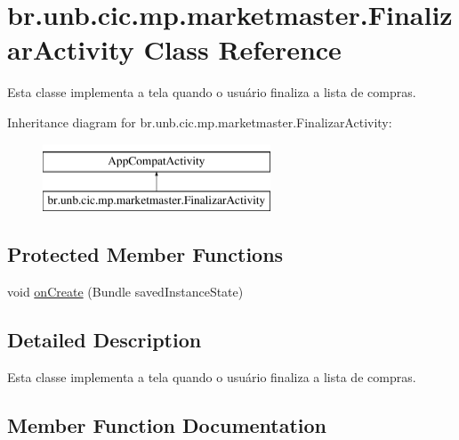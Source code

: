 \hypertarget{classbr_1_1unb_1_1cic_1_1mp_1_1marketmaster_1_1FinalizarActivity}{}\section{br.\+unb.\+cic.\+mp.\+marketmaster.\+Finalizar\+Activity Class Reference}
\label{classbr_1_1unb_1_1cic_1_1mp_1_1marketmaster_1_1FinalizarActivity}


Esta classe implementa a tela quando o usuário finaliza a lista de compras.  


Inheritance diagram for br.\+unb.\+cic.\+mp.\+marketmaster.\+Finalizar\+Activity\+:\begin{figure}[H]
\begin{center}
\leavevmode
\includegraphics[height=2.000000cm]{classbr_1_1unb_1_1cic_1_1mp_1_1marketmaster_1_1FinalizarActivity}
\end{center}
\end{figure}
\subsection*{Protected Member Functions}
\begin{DoxyCompactItemize}
\item 
void \mbox{\hyperlink{classbr_1_1unb_1_1cic_1_1mp_1_1marketmaster_1_1FinalizarActivity_a429e945cf72ba52f1f8e983c4106e917}{on\+Create}} (Bundle saved\+Instance\+State)
\end{DoxyCompactItemize}


\subsection{Detailed Description}
Esta classe implementa a tela quando o usuário finaliza a lista de compras. 

\subsection{Member Function Documentation}
\mbox{\label{classbr_1_1unb_1_1cic_1_1mp_1_1marketmaster_1_1FinalizarActivity_a429e945cf72ba52f1f8e983c4106e917}} 

